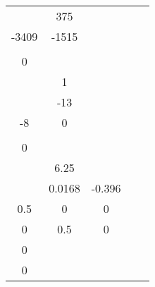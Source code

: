 \documentclass[runningheads,a4paper]{llncs}
\begin{document}
\begin{table}[htb]
\begin{tabular}{|c|c|c|c|c|}
\begin{array}{cc}
0		& 375 \\
-3409	& -1515\\
\end{array}\right]$ & $\left[\begin{array}{c}
125 \\ 0 \\
\end{array}\right]$ & $\left[\begin{array}{cc}
0 & 1\\
\end{array}\right]$ & 0 \\ \hline
\begin{tabular}[c]{@{}c@{}}Automotive\\ Cruise\\ System\end{tabular} & -0.05 & 0.03125 & 0.032 & 0 \\ \hline
\begin{tabular}[c]{@{}c@{}}DC Motor\\ Rate\end{tabular} & $\left[\begin{array}{cc}
-1000		& -13 \\
-8			& 0\\
\end{array}\right]$ & $\left[\begin{array}{c}
4 \\ 0 \\
\end{array}\right]$ & $\left[\begin{array}{cc}
0 & 6.25\\
\end{array}\right]$ & 0 \\ \hline
\begin{tabular}[c]{@{}c@{}}Helicopter\\ Longitudinal\\ Motion\end{tabular}    & $\left[\begin{array}{ccc}
-0.42		& 0.0168		& -0.396	\\
0.5			& 0				& 0			\\
0			& 0.5 			& 0			
\end{array}\right]$ & $\left[\begin{array}{c}
16 \\ 0 \\ 0
\end{array}\right]$ & $~
\left[\begin{array}{ccc}

\end{array}
\end{tabular}
\end{table}
\end{document}
